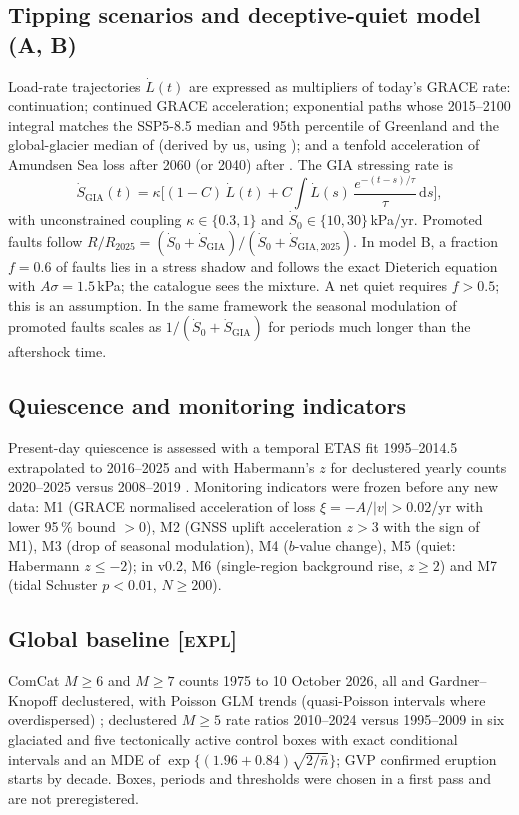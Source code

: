 \documentclass[11pt,a4paper]{article}
\newcommand{\expl}{\textnormal{\textsc{[expl]}}}
\begin{document}
\subsection{Tipping scenarios and deceptive-quiet model (A, B)}
Load-rate trajectories $\dot L(t)$ are expressed as multipliers of today's GRACE rate: continuation; continued GRACE acceleration; exponential paths whose 2015--2100 integral matches the SSP5-8.5 median and 95th percentile of Greenland and the global-glacier median of \textcite{edwards2021} (derived by us, using \cite{hugonnet2021}); and a tenfold acceleration of Amundsen Sea loss after 2060 (or 2040) after \textcite{deconto2021}. The GIA stressing rate is
\begin{equation}
\dot S_\mathrm{GIA}(t) = \kappa\Big[(1-C)\,\dot L(t) + C \int \dot L(s)\, \frac{e^{-(t-s)/\tau}}{\tau}\,\mathrm{d}s\Big],
\end{equation}
with unconstrained coupling $\kappa\in\{0.3,1\}$ and $\dot S_0\in\{10,30\}$\,kPa/yr. Promoted faults follow $R/R_{2025}=(\dot S_0+\dot S_\mathrm{GIA})/(\dot S_0+\dot S_\mathrm{GIA,2025})$. In model B, a fraction $f=0.6$ of faults lies in a stress shadow \parencite{harris1998,hampel2010} and follows the exact Dieterich equation with $A\sigma=1.5$\,kPa; the catalogue sees the mixture. A net quiet requires $f>0.5$; this is an assumption. In the same framework the seasonal modulation of promoted faults scales as $1/(\dot S_0+\dot S_\mathrm{GIA})$ for periods much longer than the aftershock time.

\subsection{Quiescence and monitoring indicators}
Present-day quiescence is assessed with a temporal ETAS fit 1995--2014.5 extrapolated to 2016--2025 \parencite{ogata1992} and with Habermann's $z$ for declustered yearly counts 2020--2025 versus 2008--2019 \parencite{wyss1988,habermann1991}. Monitoring indicators were frozen before any new data: M1 (GRACE normalised acceleration of loss $\xi=-A/|v|>0.02$/yr with lower 95\,\% bound $>0$), M2 (GNSS uplift acceleration $z>3$ with the sign of M1), M3 (drop of seasonal modulation), M4 ($b$-value change), M5 (quiet: Habermann $z\leq-2$); in v0.2, M6 (single-region background rise, $z\geq2$) and M7 (tidal Schuster $p<0.01$, $N\geq200$).

\subsection{Global baseline \expl}
ComCat $M\geq6$ and $M\geq7$ counts 1975 to 10 October 2026, all and Gardner--Knopoff declustered, with Poisson GLM trends (quasi-Poisson intervals where overdispersed) \parencite[cf.][]{shearer2012}; declustered $M\geq5$ rate ratios 2010--2024 versus 1995--2009 in six glaciated and five tectonically active control boxes with exact conditional intervals and an MDE of $\exp\{(1.96+0.84)\sqrt{2/\bar n}\}$; GVP confirmed eruption starts by decade. Boxes, periods and thresholds were chosen in a first pass and are not preregistered.
\end{document}
